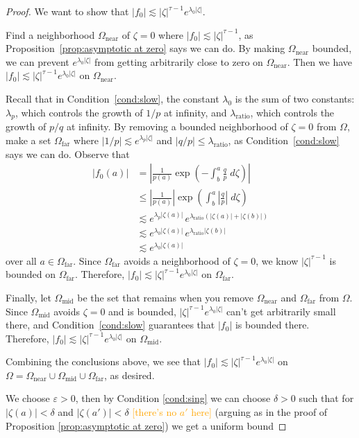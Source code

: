 \documentclass{article}
\theoremstyle{plain}
\newcommand{\solproto}{f_0}
\newcommand{\domain}{\Omega}
\begin{document}
\begin{proof}
We want to show that $|\solproto| \lesssim |\zeta|^{\tau-1} e^{\lambda_0|\zeta|}$.

Find a neighborhood $\domain_\text{near}$ of $\zeta = 0$ where $|\solproto| \lesssim |\zeta|^{\tau-1}$, as Proposition~\ref{prop:asymptotic at zero} says we can do. By making $\domain_\text{near}$ bounded, we can prevent $e^{\lambda_0|\zeta|}$ from getting arbitrarily close to zero on $\domain_\text{near}$. Then we have $|\solproto| \lesssim |\zeta|^{\tau-1} e^{\lambda_0|\zeta|}$ on $\domain_\text{near}$.

Recall that in Condition~\eqref{cond:slow}, the constant $\lambda_0$ is the sum of two constants: $\lambda_p$, which controls the growth of $1/p$ at infinity, and $\lambda_\text{ratio}$, which controls the growth of $p/q$ at infinity. By removing a bounded neighborhood of $\zeta = 0$ from $\domain$, make a set $\domain_\text{far}$ where $|1/p| \lesssim e^{\lambda_p |\zeta|}$ and $|q/p| \le \lambda_\text{ratio}$, as Condition~\eqref{cond:slow} says we can do. Observe that
\begin{align*}
|\solproto(a)| & = \left| \frac{1}{p(a)} \exp\left(-\int_{b}^{a}\frac{q}{p}\;d\zeta\right) \right| \\
& \le \left|\frac{1}{p(a)}\right| \exp\left(\int_{b}^{a}\left|\frac{q}{p}\right|\;d\zeta\right) \\
& \lesssim e^{\lambda_p|\zeta(a)|}\,e^{\lambda_\text{ratio}(|\zeta(a)| + |\zeta(b)|)} \\
& \lesssim e^{\lambda_0|\zeta(a)|}\,e^{\lambda_\text{ratio}|\zeta(b)|} \\
& \lesssim e^{\lambda_0|\zeta(a)|}
\end{align*}
over all $a \in \domain_\text{far}$. Since $\domain_\text{far}$ avoids a neighborhood of $\zeta = 0$, we know $|\zeta|^{\tau-1}$ is bounded on $\domain_\text{far}$. Therefore, $|\solproto| \lesssim |\zeta|^{\tau-1} e^{\lambda_0|\zeta|}$ on $\domain_\text{far}$.

Finally, let $\domain_\text{mid}$ be the set that remains when you remove $\domain_\text{near}$ and $\domain_\text{far}$ from $\domain$. Since $\domain_\text{mid}$ avoids $\zeta = 0$ and is bounded, $|\zeta|^{\tau-1} e^{\lambda_0|\zeta|}$ can't get arbitrarily small there, and Condition~\eqref{cond:slow} guarantees that $|\solproto|$ is bounded there. Therefore, $|\solproto| \lesssim |\zeta|^{\tau-1} e^{\lambda_0|\zeta|}$ on $\domain_\text{mid}$.

Combining the conclusions above, we see that $|\solproto| \lesssim |\zeta|^{\tau-1} e^{\lambda_0|\zeta|}$ on $\domain = \domain_\text{near} \cup \domain_\text{mid} \cup \domain_\text{far}$, as desired.
\par\color{RoyalBlue}
We choose $\varepsilon>0$, then by Condition \eqref{cond:sing} we can choose $\delta>0$ such that for $|\zeta(a)|<\delta$ and $|\zeta(a')|<\delta$ \textcolor{orange}{[there's no $a'$ here]} (arguing as in the proof of Proposition \ref{prop:asymptotic at zero}) we get a uniform bound 


\end{proof}
\end{document}
